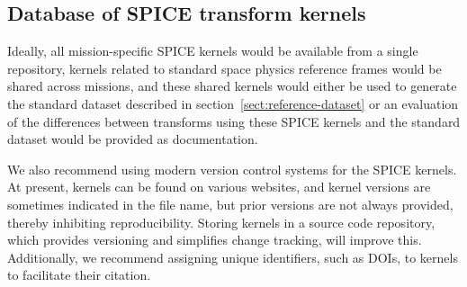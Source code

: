 \documentclass[draft]{agujournal2019}
\begin{document}


\subsection{Database of SPICE transform kernels}




Ideally, all mission-specific SPICE kernels would be available from a single repository, kernels related to standard space physics reference frames would be shared across missions, and these shared kernels would either be used to generate the standard dataset described in section~\ref{sect:reference-dataset} or an evaluation of the differences between transforms using these SPICE kernels and the standard dataset would be provided as documentation.

We also recommend using modern version control systems for the SPICE kernels. At present, kernels can be found on various websites, and kernel versions are sometimes indicated in the file name, but prior versions are not always provided, thereby inhibiting reproducibility. Storing kernels in a source code repository, which provides versioning and simplifies change tracking, will improve this. Additionally, we recommend assigning unique identifiers, such as DOIs, to kernels to facilitate their citation.




\end{document}
